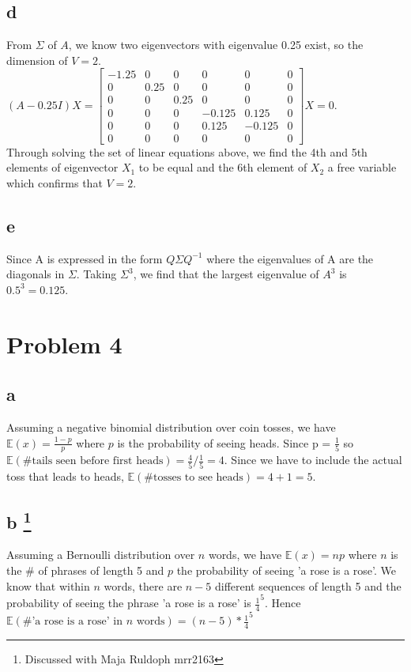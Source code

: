 \documentclass[twoside]{homework}
\begin{document}
\subsection*{d}
From $\Sigma$ of $A$, we know two eigenvectors with eigenvalue 0.25 exist, so the dimension of $V = 2$. 
\\$(A - 0.25I)X = 
\begin{bmatrix}
    -1.25 & 0 & 0 & 0 & 0 & 0 \\
    0 & 0.25 & 0 & 0 & 0 & 0 \\
    0 & 0 & 0.25 & 0 & 0 & 0 \\
    0 & 0 & 0 & -0.125 & 0.125 & 0 \\
    0 & 0 & 0 & 0.125 & -0.125 & 0 \\
    0 & 0 & 0 & 0 & 0 & 0
\end{bmatrix}X = 0$. 
\\ 
Through solving the set of linear equations above, we find the 4th and 5th elements of eigenvector $X_1$ to be equal and the 6th element of $X_2$ a free variable which confirms that $V = 2$.

\subsection*{e}
Since A is expressed in the form $Q \Sigma Q^{-1}$ where the eigenvalues of A are the diagonals in $\Sigma$. Taking $\Sigma^3$, we find that the largest eigenvalue of $A^3$ is $0.5^3 = 0.125$.

\newpage
\section*{Problem 4}
\subsection*{a}
Assuming a negative binomial distribution over coin tosses, we have $\mathbb{E}(x) = \frac{1 - p}{p}$ where $p$ is the probability of seeing heads. Since p = $\frac{1}{5}$ so $\mathbb{E}(\textrm{\# tails seen before first heads}) = \frac{4}{5}/\frac{1}{5} = 4$. Since we have to include the actual toss that leads to heads, $\mathbb{E}(\textrm{\# tosses to see heads}) = 4 + 1 = 5$.

\subsection*{b \footnote{Discussed with Maja Ruldoph mrr2163}}
Assuming a Bernoulli distribution over $n$ words, we have $\mathbb{E}(x) = np$ where $n$ is the \# of phrases of length 5 and $p$ the probability of seeing 'a rose is a rose'. We know that within $n$ words, there are $n-5$ different sequences of length 5 and the probability of seeing the phrase 'a rose is a rose' is $\frac{1}{4}^5$. Hence $\mathbb{E}(\textrm{\# 'a rose is a rose' in $n$ words}) = (n-5) * \frac{1}{4}^5$
\end{document}
